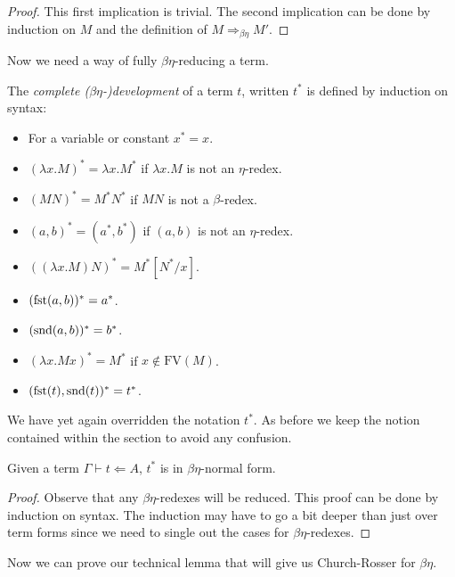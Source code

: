 \begin{proof}
    This first implication is trivial. The second implication can be done by induction on $M$ and the definition of $M \Rightarrow_{\beta\eta} M'$.
\end{proof}

Now we need a way of fully $\beta \eta$-reducing a term.

\begin{defin}
    The \emph{complete ($\beta\eta$-)development} of a term $t$, written $t^*$ is defined by induction on syntax:
    \begin{itemize}
        \item For a variable or constant $x^*= x$.
        \item $(\lambda x . M)^* = \lambda x . M^*$ if $\lambda x . M$ is not an $\eta$-redex.
        \item $(M N)^* = M^* N^*$ if $MN$ is not a $\beta$-redex.
        \item $(a, b)^* = (a^*, b^*)$ if $(a, b)$ is not an $\eta$-redex.
        \item $((\lambda x . M) N)^* = M^* [N^* / x]$.
        \item $(\mathrm{fst}(a, b))^* = a^*$.
        \item $(\mathrm{snd}(a, b))^* = b^*$.
        \item $(\lambda x . M x)^* = M^*$ if $x \not \in \mathrm{FV}(M)$.
        \item $(\mathrm{fst}(t), \mathrm{snd}(t))^* = t^*$.
    \end{itemize}
\end{defin}

\begin{remark}
    We have yet again overridden the notation $t^*$. As before we keep the notion contained within the section to avoid any confusion.
\end{remark}

\begin{lemma}
    Given a term $\Gamma \vdash t \Leftarrow A$, $t^*$ is in $\beta \eta$-normal form.
\end{lemma}

\begin{proof}
    Observe that any $\beta \eta$-redexes will be reduced. This proof can be done by induction on syntax. The induction may have to go a bit deeper than just over term forms since we need to single out the cases for $\beta \eta$-redexes.
\end{proof}

Now we can prove our technical lemma that will give us Church-Rosser for $\beta\eta$.


